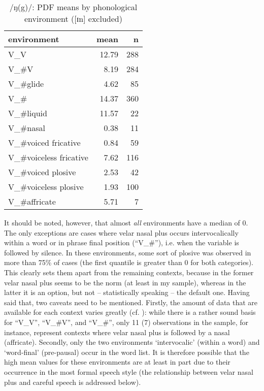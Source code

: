 \begin{table}[h]
	\centering
	\caption{/ŋ(g)/: PDF means by phonological environment ([ɪn] excluded)}
	\label{tab.ng.mean.environment}
	\begin{tabular}{lrr}
		\toprule
		environment & mean \isi{PDF} & n\\
		\midrule
		V\_V & 12.79 & 288\\
		V\_\#V & 8.19 & 284\\
		V\_\#glide & 4.62 & 85\\
		V\_\# & 14.37 & 360\\
		V\_\#liquid & 11.57 & 22\\
		V\_\#nasal & 0.38 & 11\\
		V\_\#voiced fricative & 0.84 & 59\\
		V\_\#voiceless fricative & 7.62 & 116\\
		V\_\#voiced plosive & 2.53 & 42\\
		V\_\#voiceless plosive & 1.93 & 100\\
		V\_\#affricate & 5.71 & 7\\
		\bottomrule
	\end{tabular}
\end{table}

It should be noted, however, that almost \emph{all} environments have a median  of 0.
The only exceptions are cases where velar nasal plus occurs intervocalically within a word or in phrase final position (``V\_\#''), i.e. when the variable is followed by silence.
In these environments, some sort of plosive was observed in more than 75\% of cases (the first quantile is greater than 0 for both categories).
This clearly sets them apart from the remaining contexts, because in the former velar nasal plus seems to be the norm (at least in my sample), whereas in the latter it is an option, but not -- statistically speaking -- the default one.
Having said that, two caveats need to be mentioned.
Firstly, the amount of data that are available for each context varies greatly (cf. ): while there is a rather sound basis for ``V\_V'', ``V\_\#V'', and ``V\_\#'', only 11 (7) observations in the sample, for instance, represent contexts where velar nasal plus is followed by a nasal (affricate).
Secondly, only the two environments `intervocalic' (within a word) and `word-final' (pre-pausal) occur in the word list.
It is therefore possible that the high mean  values for these environments are at least in part due to their occurrence in the most formal speech style (the relationship between velar nasal plus and careful speech is addressed below).

